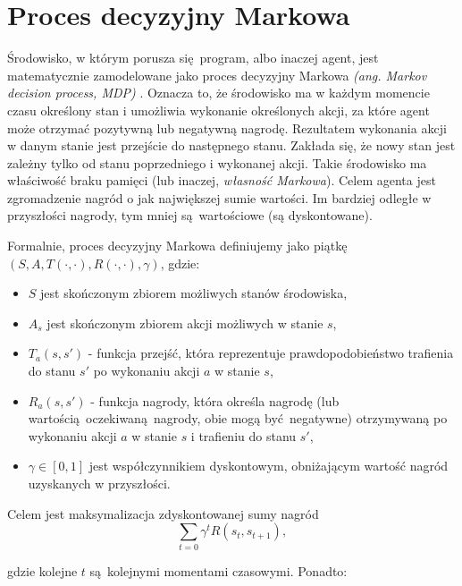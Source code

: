 \documentclass[polish,master,a4paper,oneside]{ppfcmthesis}
\begin{document}
 \section{Proces decyzyjny Markowa}\label{mdp}

Środowisko, w którym porusza się program, albo inaczej agent, jest matematycznie zamodelowane jako proces decyzyjny Markowa \textit{(ang. Markov decision process, MDP)} \cite{bellman1954}. Oznacza to, że środowisko ma w każdym momencie czasu określony stan i umożliwia wykonanie określonych akcji, za które agent może otrzymać pozytywną lub negatywną nagrodę. Rezultatem wykonania akcji w danym stanie jest przejście do następnego stanu. Zakłada się, że nowy stan jest zależny tylko od stanu poprzedniego i wykonanej akcji. Takie środowisko ma właściwość braku pamięci (lub inaczej, \textit{własność Markowa}). Celem agenta jest zgromadzenie nagród o jak największej sumie wartości. Im bardziej odległe w przyszłości nagrody, tym mniej są wartościowe (są dyskontowane).

\vspace{5mm}

Formalnie, proces decyzyjny Markowa definiujemy jako piątkę $(S,A,T(\cdot,\cdot),R(\cdot,\cdot),\gamma)$, gdzie:
\begin{itemize}
\item $S$ jest skończonym zbiorem możliwych stanów środowiska,
\item $A_s$ jest skończonym zbiorem akcji możliwych w stanie $s$,
\item $T_a(s,s')$ - funkcja przejść, która reprezentuje prawdopodobieństwo trafienia do stanu $s'$ po wykonaniu akcji $a$ w stanie $s$,
\item $R_a(s,s')$ - funkcja nagrody, która określa nagrodę (lub wartością oczekiwaną nagrody, obie mogą być negatywne) otrzymywaną po wykonaniu akcji $a$ w stanie $s$ i trafieniu do stanu $s'$,
\item $\gamma \in [0,1]$ jest współczynnikiem dyskontowym, obniżającym wartość nagród uzyskanych w przyszłości.
\end{itemize}

Celem jest maksymalizacja zdyskontowanej sumy nagród $$\sum_{t=0}{\gamma^t R(s_t,s_{t+1})},$$

gdzie kolejne $t$ są kolejnymi momentami czasowymi. Ponadto:
\end{document}
